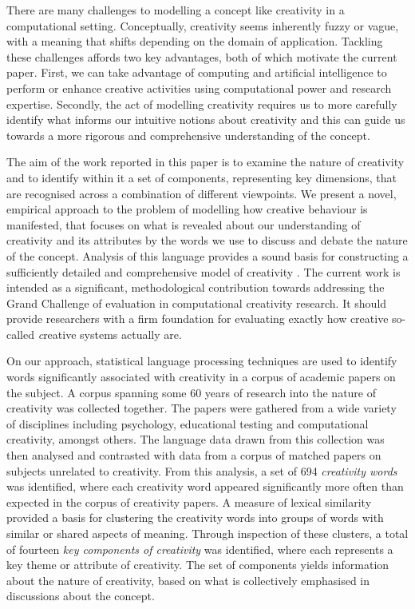 \documentclass[10pt,letterpaper]{article}
\begin{document}
There are many challenges to modelling a concept like creativity in a computational setting. Conceptually, creativity seems inherently fuzzy or vague, with a meaning that shifts depending on the domain of application. Tackling these challenges affords two key advantages, both of which motivate the current paper. First, we can take advantage of computing and artificial intelligence to perform or enhance creative activities using computational power and research expertise. Secondly, the act of modelling creativity requires us to more carefully identify what informs our intuitive notions about creativity and this can guide us towards a more rigorous and comprehensive understanding of the concept.  

The aim of the work reported in this paper is to examine the nature of creativity and to identify within it a set of components, representing key dimensions, that are recognised across a combination of different viewpoints. We present a novel, empirical approach to the problem of modelling how creative behaviour is manifested, that focuses on what is revealed about our understanding of creativity and its attributes by the words we use to discuss and debate the nature of the concept. Analysis of this language provides a sound basis for constructing a sufficiently detailed and comprehensive model of creativity \cite{lakoff87,wittgenstein58}. The current work is intended as a significant, methodological contribution towards addressing the Grand Challenge of evaluation in computational creativity research. It should provide researchers with a firm foundation for evaluating exactly how creative so-called {\emph creative systems} actually are.

On our approach, statistical language processing techniques are used to identify words significantly associated with creativity in a corpus of academic papers on the subject. A corpus spanning some 60 years of research into the nature of creativity was collected together. The papers were gathered from a wide variety of disciplines including psychology, educational testing and computational creativity, amongst others. The language data drawn from this collection was then analysed and contrasted with data from a corpus of matched papers on subjects unrelated to creativity. From this analysis, a set of 694 {\em creativity words\/} was identified, where each creativity word appeared significantly more often than expected in the corpus of creativity papers. A measure of lexical similarity provided a basis for clustering the creativity words into groups of words with similar or shared aspects of meaning. Through inspection of these clusters, a total of fourteen {\em key components of creativity\/} was identified, where each represents a key theme or attribute of creativity. The set of components yields information about the nature of creativity, based on what is collectively emphasised in discussions about the concept. 
\end{document}
